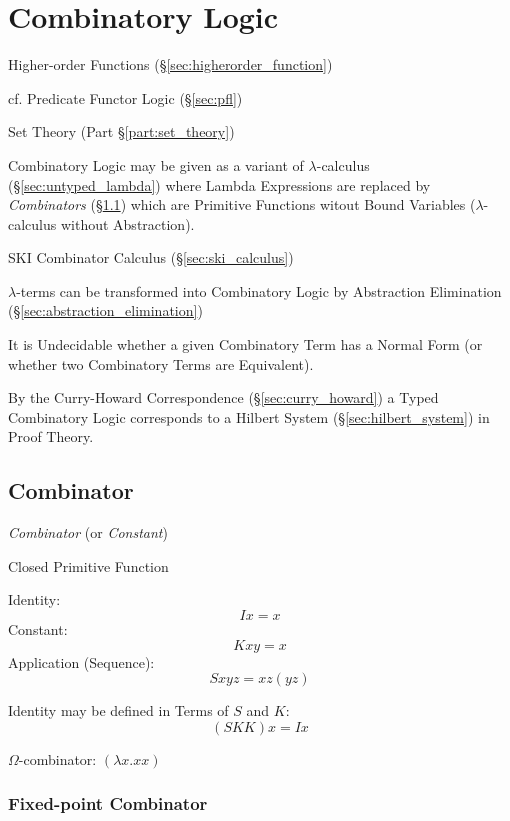 \section{Combinatory Logic}\label{sec:combinatory_logic}

Higher-order Functions (\S\ref{sec:higherorder_function})

\fist cf. Predicate Functor Logic (\S\ref{sec:pfl})

Set Theory (Part \S\ref{part:set_theory})

Combinatory Logic may be given as a variant of $\lambda$-calculus
(\S\ref{sec:untyped_lambda}) where Lambda Expressions are replaced by
\emph{Combinators} (\S\ref{sec:combinator}) which are Primitive
Functions witout Bound Variables ($\lambda$-calculus without
Abstraction).

SKI Combinator Calculus (\S\ref{sec:ski_calculus})

$\lambda$-terms can be transformed into Combinatory Logic by
Abstraction Elimination (\S\ref{sec:abstraction_elimination})

It is Undecidable whether a given Combinatory Term has a Normal Form
(or whether two Combinatory Terms are Equivalent).

By the Curry-Howard Correspondence (\S\ref{sec:curry_howard}) a Typed
Combinatory Logic corresponds to a Hilbert System
(\S\ref{sec:hilbert_system}) in Proof Theory.



\subsection{Combinator}\label{sec:combinator}

\emph{Combinator} (or \emph{Constant})

Closed Primitive Function

Identity:
\[
  I x = x
\]
Constant:
\[
  K x y = x
\]
Application (Sequence):
\[
  S x y z = x z (y z)
\]

Identity may be defined in Terms of $S$ and $K$:
\[
  (S K K) x = I x
\]

$\Omega$-combinator: $(\lambda x. x x)$



\subsubsection{Fixed-point Combinator}\label{sec:fixedpoint_combinator}

